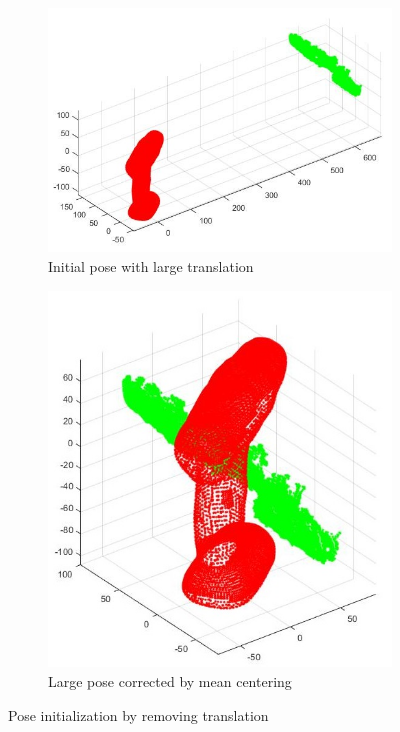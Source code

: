 \documentclass[letterpaper, 10 pt, conference]{ieeeconf}  %
\begin{document}
\begin{figure}
\centering
   \begin{subfigure}[b]{0.5\textwidth}
   \includegraphics[scale = 0.5]{init2.jpg}
   \caption{Initial pose with large translation}
   \label{fig:init} 
\end{subfigure}

\begin{subfigure}[b]{0.5\textwidth}
   \includegraphics[scale =0.5]{mean.jpg}
   \caption{Large pose corrected by mean centering}
   \label{fig:mean}
\end{subfigure}
\caption{Pose initialization by removing translation}
\end{figure}
\end{document}
